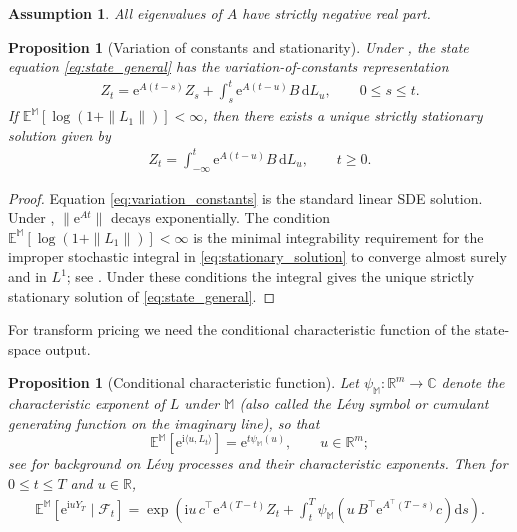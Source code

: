\documentclass[10pt,a4paper,reqno]{amsart}
\newtheorem{proposition}[theorem]{Proposition}
\newtheorem{assumption}[theorem]{Assumption}
\newcommand{\R}{\mathbb{R}}
\newcommand{\C}{\mathbb{C}}
\newcommand{\E}{\mathbb{E}}
\newcommand{\F}{\mathcal{F}}
\newcommand{\1}{\mathbbm{1}}
\newcommand{\dd}{\mathrm{d}}
\newcommand{\ii}{\mathrm{i}}
\newcommand{\ee}{\mathrm{e}}
\begin{document}
\begin{assumption}\label{ass:stableA}
All eigenvalues of $A$ have strictly negative real part.
\end{assumption}

\begin{proposition}[Variation of constants and stationarity]
\label{prop:variation_constants}
Under , the state equation \eqref{eq:state_general} has the
variation-of-constants representation
\begin{align}\label{eq:variation_constants}
  Z_t = \ee^{A(t-s)} Z_s + \int_s^t \ee^{A(t-u)} B\,\dd L_u,
  \qquad 0 \le s \le t.
\end{align}
If $\mathbb{E}^{\mathbb{M}}[\log(1+\|L_1\|)] < \infty$, then there exists a
unique strictly stationary solution given by
\begin{align}\label{eq:stationary_solution}
  Z_t = \int_{-\infty}^t \ee^{A(t-u)} B\,\dd L_u,
  \qquad t \ge 0.
\end{align}
\end{proposition}

\begin{proof}
Equation \eqref{eq:variation_constants} is the standard linear SDE solution.
Under , $\|\ee^{At}\|$ decays exponentially. The condition
$\mathbb{E}^{\mathbb{M}}[\log(1+\|L_1\|)] < \infty$ is the minimal
integrability requirement for the improper stochastic integral in
\eqref{eq:stationary_solution} to converge almost surely and in $L^1$;
see \citet{Bro01}. Under these conditions the integral gives the unique strictly
stationary solution of \eqref{eq:state_general}.
\end{proof}

For transform pricing we need the conditional characteristic function of the
state-space output.

\begin{proposition}[Conditional characteristic function]
\label{prop:cf_single_factor}
Let $\psi_{\mathbb{M}}:\R^m \to \C$ denote the characteristic exponent of
$L$ under $\mathbb{M}$ (also called the Lévy symbol or cumulant generating
function on the imaginary line), so that
$$
\E^{\mathbb{M}}\!\left[\ee^{\ii\langle u,L_t\rangle}\right]
= \ee^{t\psi_{\mathbb{M}}(u)},\qquad u \in \R^m;
$$
see \citet{Con04} for background on Lévy processes and their characteristic
exponents.
Then for $0 \le t \le T$ and $u \in \R$,
\begin{align}\label{eq:single_factor_cf}
  \E^{\mathbb{M}}\!\left[\ee^{\ii u Y_T}\mid \F_t\right]
  = \exp\!\left(
      \ii u\, c^\top \ee^{A(T-t)} Z_t
      + \int_t^T \psi_{\mathbb{M}}\!\left(
          u\, B^\top \ee^{A^\top(T-s)} c
        \right)\dd s
    \right).
\end{align}
\end{proposition}
\end{document}
